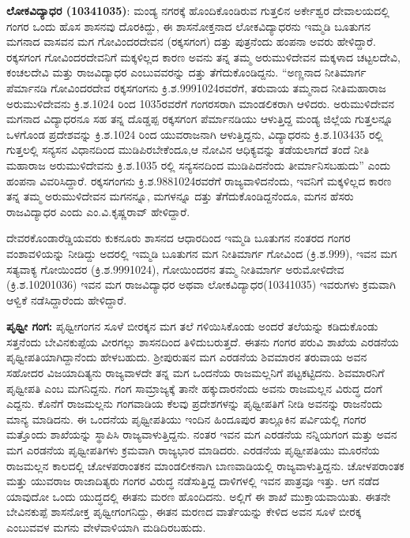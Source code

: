 \textbf{ಲೋಕವಿದ್ಯಾಧರ (1034\general{\enginline{-}}1035)}: ಮಂಡ್ಯ ನಗರಕ್ಕೆ ಹೊಂದಿಕೊಂಡಿರುವ ಗುತ್ತಲಿನ ಅರ್ಕೇಶ್ವರ ದೇವಾಲಯದಲ್ಲಿ ಗಂಗರ ಒಂದು ಹೊಸ ಶಾಸನವು ದೊರಕಿದ್ದು, ಈ ಶಾಸನೋಕ್ತನಾದ ಲೋಕವಿದ್ಯಾಧರನು ಇಮ್ಮಡಿ ಬೂತುಗನ ಮಗನಾದ ವಾಸವನ ಮಗ ಗೋವಿಂದರದೇವನ (ರಕ್ಕಸಗಂಗ) ದತ್ತು ಪುತ್ರನೆಂದು ಹಂಪನಾ ಅವರು ಹೇಳಿದ್ದಾರೆ. ರಕ್ಕಸಗಂಗ ಗೋವಿಂದರದೇವನಿಗೆ ಮಕ್ಕಳಿಲ್ಲದ ಕಾರಣ ಅವನು ತನ್ನ ತಮ್ಮ ಅರುಮುಳಿದೇವನ ಮಕ್ಕಳಾದ ಚಟ್ಟಲದೇವಿ, ಕಂಚಲದೇವಿ ಮತ್ತು ರಾಜವಿದ್ಯಾಧರ ಎಂಬುವವರನ್ನು ದತ್ತು ತೆಗೆದುಕೊಂಡಿದ್ದನು. “ಅಣ್ಣನಾದ ನೀತಿಮಾರ್ಗ ಪೆರ್ಮಾನಡಿ ಗೋವಿಂದರದೇವ ರಕ್ಕಸಗಂಗನು ಕ್ರಿ.ಶ.999\enginline{-}1024ರವರೆಗೆ, ತರುವಾಯ ತಮ್ಮನಾದ ನೀತಿಮಹಾರಾಜ ಅರುಮುಳಿದೇವನು ಕ್ರಿ.ಶ.1024 ರಿಂದ 1035ರವರೆಗೆ ಗಂಗರಸರಾಗಿ ಮಾಂಡಲಿಕರಾಗಿ ಆಳಿದರು. ಅರುಮುಳಿದೇವನ ಮಗನಾದ ವಿದ್ಯಾಧರನೂ ಸಹ ತನ್ನ ದೊಡ್ಡಪ್ಪ ರಕ್ಕಸಗಂಗ ಪೆರ್ಮಾನಡಿಯು ಆಳುತ್ತಿದ್ದ ಮಂಡ್ಯ ಜಿಲ್ಲೆಯ ಗುತ್ತಲನ್ನೂ ಒಳಗೊಂಡ ಪ್ರದೇಶವನ್ನು ಕ್ರಿ.ಶ.1024 ರಿಂದ ಯುವರಾಜನಾಗಿ ಆಳುತ್ತಿದ್ದನು, ವಿದ್ಯಾಧರನು ಕ್ರಿ.ಶ.1034\enginline{-}35 ರಲ್ಲಿ ಗುತ್ತಲಲ್ಲಿ ಸನ್ಯಸನ ವಿಧಾನದಿಂದ ಮುಡಿಪಿರ\-ಬೇಕೆಂದೂ,ಆ ನೋವಿನ ಆಧಿಕ್ಯವನ್ನು ತಡೆಯಲಾಗದೆ ತಂದೆ ನೀತಿ ಮಹಾರಾಜ ಅರುಮುಳಿದೇವನು ಕ್ರಿ.ಶ.1035 ರಲ್ಲಿ ಸನ್ಯಸನದಿಂದ ಮುಡಿಪಿದನೆಂದು ತೀರ್ಮಾನಿಸಬಹುದು” ಎಂದು ಹಂಪನಾ ವಿವರಿಸಿದ್ದಾರೆ. ರಕ್ಕಸಗಂಗನು ಕ್ರಿ.ಶ.988\enginline{-}1024ರವರೆಗೆ ರಾಜ್ಯವಾಳಿದನೆಂದು, ಇವನಿಗೆ ಮಕ್ಕಳಿಲ್ಲದ ಕಾರಣ ತನ್ನ ತಮ್ಮ ಅರುಮುಳಿದೇವನ ಮಗನನ್ನೂ, ಮಗಳನ್ನೂ ದತ್ತು ತೆಗೆದುಕೊಂಡಿದ್ದನೆಂದೂ, ಮಗನ ಹೆಸರು ರಾಜವಿದ್ಯಾಧರ ಎಂದು ಎಂ.ವಿ.ಕೃಷ್ಣರಾವ್​ ಹೇಳಿದ್ದಾರೆ.

ದೇವರಕೊಂಡಾರೆಡ್ಡಿಯವರು ಕುಕನೂರು ಶಾಸನದ ಆಧಾರದಿಂದ ಇಮ್ಮಡಿ ಬೂತುಗನ ನಂತರದ ಗಂಗರ ವಂಶಾವಳಿ\-ಯನ್ನು ನೀಡಿದ್ದು ಅದರಲ್ಲಿ ಇಮ್ಮಡಿ ಬೂತುಗನ ಮಗ ನೀತಿಮಾರ್ಗ ಗೋವಿಂದ (ಕ್ರಿ.ಶ.999), ಇವನ ಮಗ ಸತ್ಯವಾಕ್ಯ ಗೋಯಿಂದರ (ಕ್ರಿ.ಶ.999\enginline{-}1024), ಗೋಯಿಂದರನ ತಮ್ಮ ನೀತಿಮಾರ್ಗ ಅರುಮೋಳಿದೇವ (ಕ್ರಿ.ಶ.1020\enginline{-}1036) ಇವನ ಮಗ ರಾಜವಿದ್ಯಾಧರ ಅಥವಾ ಲೋಕವಿದ್ಯಾಧರ(1034\enginline{-}1035) ಇವರುಗಳು ಕ್ರಮವಾಗಿ ಆಳ್ವಿಕೆ ನಡೆಸಿದ್ದಾರೆಂದು ಹೇಳಿದ್ದಾರೆ.

\textbf{ಪೃಥ್ವೀ ಗಂಗ:} ಪೃಥ್ವೀಗಂಗನ ಸೂಳೆ ಬೀರಕ್ಕನ ಮಗ ತಲೆ ಗಳಿಯಿಸಿಕೊಂಡು ಅಂದರೆ ತಲೆಯನ್ನು ಕಡಿದುಕೊಂಡು ಸತ್ತನೆಂದು ಬೇವಿನಕುಪ್ಪೆಯ ವೀರಗಲ್ಲು ಶಾಸನದಿಂದ ತಿಳಿದುಬರುತ್ತದೆ. ಈತನು ಗಂಗರ ಪರುವಿ ಶಾಖೆಯ ಎರಡನೆಯ ಪೃಥ್ವೀಪತಿಯಾಗಿದ್ದಾನೆಂದು ಹೇಳಬಹುದು. ಶ‍್ರೀಪುರುಷನ ಮಗ ಎರಡನೆಯ ಶಿವಮಾರನ ತರುವಾಯ ಅವನ ಸಹೋದರ ವಿಜಯಾದಿತ್ಯನು ರಾಜ್ಯವಾಳದೇ ತನ್ನ ಮಗ ಒಂದನೆಯ ರಾಜಮಲ್ಲನಿಗೆ ಪಟ್ಟಕಟ್ಟಿದನು. ಶಿವಮಾರನಿಗೆ ಪೃಥ್ವೀಪತಿ ಎಂಬ ಮಗನಿದ್ದನು. ಗಂಗ ಸಾಮ್ರಾಜ್ಯಕ್ಕೆ ತಾನೇ ಹಕ್ಕುದಾರನೆಂದು ಅವನು ರಾಜಮಲ್ಲನ ವಿರುದ್ಧ ದಂಗೆ ಎದ್ದನು. ಕೊನೆಗೆ ರಾಜಮಲ್ಲನು ಗಂಗವಾಡಿಯ ಕೆಲವು ಪ್ರದೇಶಗಳನ್ನು ಪೃಥ್ವೀಪತಿಗೆ ನೀಡಿ ಅವನನ್ನು ರಾಜನೆಂದು ಮಾನ್ಯ ಮಾಡಿದನು. ಈ ಒಂದನೆಯ ಪೃಥ್ವೀಪತಿಯು ಇಂದಿನ ಹಿಂದೂಪುರ ತಾಲ್ಲೂಕಿನ ಪರ್ವಿಯಲ್ಲಿ ಗಂಗರ ಮತ್ತೊಂದು ಶಾಖೆಯನ್ನು ಸ್ಥಾಪಿಸಿ ರಾಜ್ಯವಾಳುತ್ತಿದ್ದನು. ನಂತರ ಇವನ ಮಗ ಎರಡನೆಯ ನನ್ನಿಯಗಂಗ ಮತ್ತು ಅವನ ಮಗ ಎರಡನೆಯ ಪೃಥ್ವೀಪತಿಗಳು ಕ್ರಮವಾಗಿ ರಾಜ್ಯಭಾರ ಮಾಡಿದರು. ಎರಡನೆಯ ಪೃಥ್ವೀಪತಿಯು ಮೂರನೆಯ ರಾಜಮಲ್ಲನ ಕಾಲದಲ್ಲಿ ಚೋಳಪರಾಂತಕನ ಮಾಂಡಲೀಕನಾಗಿ ಬಾಣವಾಡಿಯಲ್ಲಿ ರಾಜ್ಯವಾಳುತ್ತಿದ್ದನು. ಚೋಳಪರಾಂತಕ ಮತ್ತು ಯುವರಾಜ ರಾಜಾದಿತ್ಯರು ಗಂಗರ ವಿರುದ್ಧ ನಡೆಸುತ್ತಿದ್ದ ದಾಳಿಗಳಲ್ಲಿ ಇವನ ಪಾತ್ರವೂ ಇತ್ತು. ಆಗ ನಡೆದ ಯಾವುದೋ ಒಂದು ಯುದ್ಧದಲ್ಲಿ ಈತನು ಮರಣ ಹೊಂದಿದನು. ಅಲ್ಲಿಗೆ ಈ ಶಾಖೆ ಮುಕ್ತಾಯವಾಯಿತು. ಈತನೇ ಬೇವಿನಕುಪ್ಪೆ ಶಾಸನೋಕ್ತ ಪೃಥ್ವೀಗಂಗನಿದ್ದು, ಈತನ ಮರಣದ ವಾರ್ತೆಯನ್ನು ಕೇಳಿದ ಅವನ ಸೂಳೆ ಬೀರಕ್ಕ ಎಂಬುವವಳ ಮಗನು ವೇಳೆವಾಳಿಯಾಗಿ ಮಡಿದಿರಬಹುದು.


